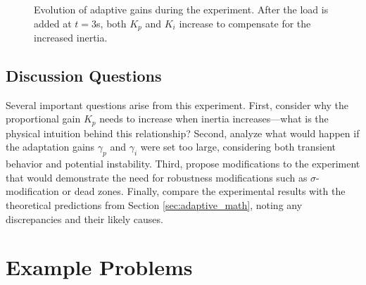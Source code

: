 \begin{figure}[H]
\centering
{}
\caption{Evolution of adaptive gains during the experiment. After the load is added at $t=3$s, both $K_p$ and $K_i$ increase to compensate for the increased inertia.}
\label{fig:gain_adaptation}
\end{figure}

\subsection{Discussion Questions}

Several important questions arise from this experiment. First, consider why the proportional gain $K_p$ needs to increase when inertia increases---what is the physical intuition behind this relationship? Second, analyze what would happen if the adaptation gains $\gamma_p$ and $\gamma_i$ were set too large, considering both transient behavior and potential instability. Third, propose modifications to the experiment that would demonstrate the need for robustness modifications such as $\sigma$-modification or dead zones. Finally, compare the experimental results with the theoretical predictions from Section \ref{sec:adaptive_math}, noting any discrepancies and their likely causes.

\section{Example Problems}
\label{sec:adaptive_examples}

